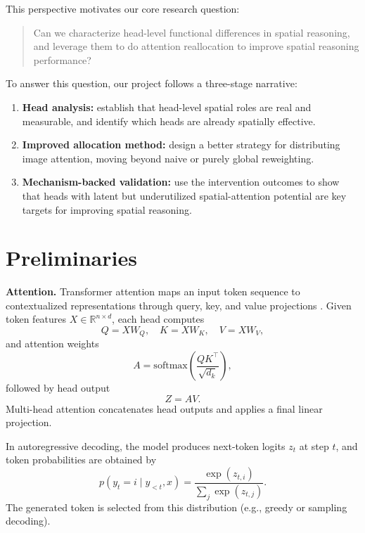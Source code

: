 \documentclass{article}
\begin{document}
This perspective motivates our core research question: 

\begin{quote}
  Can we characterize head-level functional differences in
  spatial reasoning, and leverage them to do attention reallocation
  to improve spatial reasoning performance?
\end{quote}
To answer this question, our project follows a three-stage narrative:
\begin{enumerate}[leftmargin=1.2em]
  \item \textbf{Head analysis:} establish that head-level spatial roles
  are real and measurable, and identify which heads are already
  spatially effective.
  \item \textbf{Improved allocation method:} design a better strategy
  for distributing image attention, moving beyond naive or purely global
  reweighting.
  \item \textbf{Mechanism-backed validation:} use the intervention
  outcomes to show that heads with latent but underutilized
  spatial-attention potential are key targets for improving spatial
  reasoning.
\end{enumerate}

\section{Preliminaries}
\textbf{Attention.}
Transformer attention maps an input token sequence to contextualized
representations through query, key, and value projections
\citep{vaswani2017attention}. Given token features
$X\in\mathbb{R}^{n\times d}$, each head computes
\begin{equation}
Q = XW_Q,\quad K = XW_K,\quad V = XW_V,
\end{equation}
and attention weights
\begin{equation}
A = \mathrm{softmax}\!\left(\frac{QK^\top}{\sqrt{d_k}}\right),
\end{equation}
followed by head output
\begin{equation}
Z = AV.
\end{equation}
Multi-head attention concatenates head outputs and applies a final
linear projection.

In autoregressive decoding, the model produces next-token logits $z_t$
at step $t$, and token probabilities are obtained by
\begin{equation}
p(y_t=i\mid y_{<t},x)=\frac{\exp(z_{t,i})}{\sum_j \exp(z_{t,j})}.
\end{equation}
The generated token is selected from this distribution (e.g., greedy or
sampling decoding).
\end{document}
